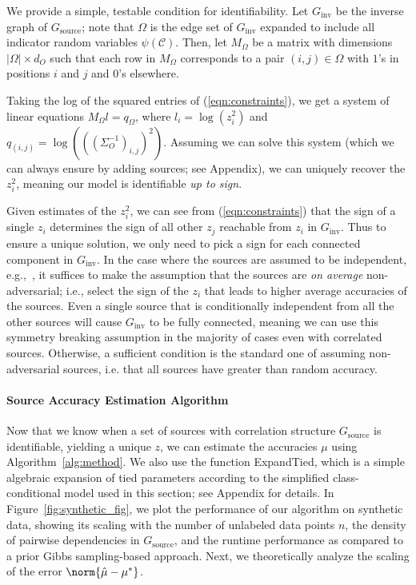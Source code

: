 \documentclass[letterpaper]{article}
\begin{document}
We provide a simple, testable condition for identifiability.
Let $G_{\text{inv}}$ be the inverse graph of $G_{\text{source}}$; note that $\Omega$ is the edge set of $G_{\text{inv}}$ expanded to include all indicator random variables $\psi(\mathcal{C})$.
Then, let $M_{\Omega}$ be a matrix with dimensions $|\Omega| \times d_O$ such that each row in $M_{\Omega}$ corresponds to a pair $(i,j) \in \Omega$ with $1$'s in positions $i$ and $j$ and 0's elsewhere.

Taking the log of the squared entries of (\ref{eqn:constraints}), we get a system of linear equations $M_\Omega l = q_\Omega$,
where $l_i = \log(z_i^2)$ and $q_{(i,j)} = \log(((\Sigma_O^{-1})_{i,j})^2)$.
Assuming we can solve this system (which we can always ensure by adding sources; see Appendix), we can uniquely recover the $z_i^2$, meaning our model is identifiable \textit{up to sign}.

Given estimates of the $z_i^2$, we can see from (\ref{eqn:constraints}) that the sign of a single $z_i$ determines the sign of all other $z_j$ reachable from $z_i$ in $G_{\text{inv}}$.
Thus to ensure a unique solution, we only need to pick a sign for each connected component in  $G_{\text{inv}}$.
In the case where the sources are assumed to be independent, e.g.,~\cite{Dalvi:2013:ACB:2488388.2488414,zhang2014spectral,dawid1979maximum}, it
suffices to make the assumption that the sources are {\em on average} non-adversarial; i.e., select the sign of the $z_i$ that leads to higher average accuracies of the sources.
Even a single source that is conditionally independent from all the other sources will cause $G_{\text{inv}}$ to be fully connected, meaning we can use this symmetry breaking assumption in the majority of cases even with correlated sources.
Otherwise, a sufficient condition is the standard one of assuming non-adversarial sources, i.e. that all sources have greater than random accuracy.


\paragraph*{Source Accuracy Estimation Algorithm}

Now that we know when a set of sources with correlation structure $G_{\text{source}}$
is identifiable, yielding a unique $z$, we can estimate the accuracies $\mu$ using Algorithm~\ref{alg:method}.
We also use the function ExpandTied, which is a simple algebraic expansion of tied parameters according to the simplified class-conditional model used in this section; see Appendix\versionswitch{}{ \ref{appendix:rank-one-reduction}} for details.
In Figure~\ref{fig:synthetic_fig}, we
plot the performance of our algorithm on synthetic data, showing its
scaling with the number of unlabeled data points $n$, the density of pairwise dependencies in $G_{\text{source}}$, and the runtime performance as compared to a prior Gibbs sampling-based approach. Next, we theoretically analyze
the scaling of the error $\norm{ \hat{\mu} - \mu^* }$.
\end{document}
